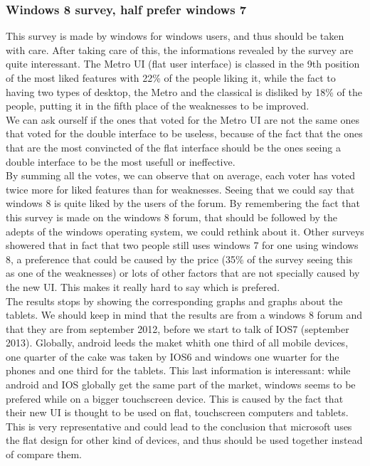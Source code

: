 \documentclass[a4paper,11pt] {article}
\theoremstyle{definition}
\begin{document}
    \subsubsection{Windows 8 survey, half prefer windows 7\cite{windows8Survey}}
This survey is made by windows for windows users, and thus should be taken with care. After taking care of this, the informations revealed by the survey are quite interessant. The Metro UI (flat user interface) is classed in the 9th position of the most liked features with 22\% of the people liking it, while the fact to having two types of desktop, the Metro and the classical is disliked by 18\% of the people, putting it in the fifth place of the weaknesses to be improved.\\
We can ask ourself if the ones that voted for the Metro UI are not the same ones that voted for the double interface to be useless, because of the fact that the ones that are the most convincted of the flat interface should be the ones seeing a double interface to be the most usefull or ineffective.
\\
By summing all the votes, we can observe that on average, each voter has voted twice more for liked features than for weaknesses. Seeing that we could say that windows 8 is quite liked by the users of the forum. By remembering the fact that this survey is made on the windows 8 forum, that should be followed by the adepts of the windows operating system, we could rethink about it. Other surveys showered that in fact that two people still uses windows 7 for one using windows 8, a preference that could be caused by the price (35\% of the survey seeing this as one of the weaknesses) or lots of other factors that are not specially caused by the new UI. This makes it really hard to say which is prefered.
\\
The results stops by showing the corresponding graphs and graphs about the tablets. We should keep in mind that the results are from a windows 8 forum and that they are from september 2012, before we start to talk of IOS7 (september 2013). Globally, android leeds the maket whith one third of all mobile devices, one quarter of the cake was taken by IOS6 and windows one wuarter for the phones and one third for the tablets. This last information is interessant: while android and IOS globally get the same part of the market, windows seems to be prefered while on a bigger touchscreen device. This is caused by the fact that their new UI is thought to be used on flat, touchscreen computers and tablets. This is very representative and could lead to the conclusion that microsoft uses the flat design for other kind of devices, and thus should be used together instead of compare them.
\end{document}
